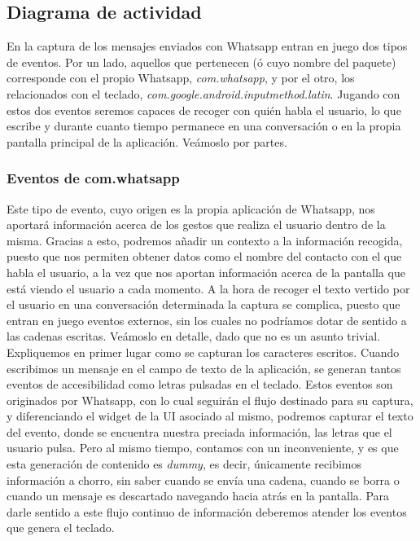\documentclass[12pt,a4paper,oneside]{book} %
\begin{document}
\subsection{Diagrama de actividad}
En la captura de los mensajes enviados con Whatsapp entran en juego dos tipos de eventos. Por un lado, aquellos que pertenecen (ó cuyo nombre del paquete) corresponde con el propio Whatsapp, \textit{com.whatsapp}, y por el otro, los relacionados con el teclado, \textit{com.google.android.inputmethod.latin}.
\newline \newline 
Jugando con estos dos eventos seremos capaces de recoger con quién habla el usuario, lo que escribe y durante cuanto tiempo permanece en una conversación o en la propia pantalla principal de la aplicación. Veámoslo por partes. 
\subsubsection{Eventos de com.whatsapp} 
Este tipo de evento, cuyo origen es la propia aplicación de Whatsapp, nos aportará información acerca de los gestos que realiza el usuario dentro de la misma. Gracias a esto, podremos añadir un contexto a la información recogida, puesto que nos permiten obtener datos como el nombre del contacto con el que habla el usuario, a la vez que nos aportan información acerca de la pantalla que está viendo el usuario a cada momento.
\newline \newline
A la hora de recoger el texto vertido por el usuario en una conversación determinada la captura se complica, puesto que entran en juego eventos externos, sin los cuales no podríamos dotar de sentido a las cadenas escritas. Veámoslo en detalle, dado que no es un asunto trivial. Expliquemos en primer lugar como se capturan los caracteres escritos. 
\newline \newline 
Cuando escribimos un mensaje en el campo de texto de la aplicación, se generan tantos eventos de accesibilidad como letras pulsadas en el teclado. Estos eventos son originados por Whatsapp, con lo cual seguirán el flujo destinado para su captura, y diferenciando el widget de la UI asociado al mismo, podremos capturar el texto del evento, donde se encuentra nuestra preciada información, las letras que el usuario pulsa. 
\newline \newline
Pero al mismo tiempo, contamos con un inconveniente, y es que esta generación de contenido es \textit{dummy}, es decir, únicamente recibimos información a chorro, sin saber cuando se envía una cadena, cuando se borra o cuando un mensaje es descartado navegando hacia atrás en la pantalla. 
\newline \newline 
Para darle sentido a este flujo continuo de información deberemos atender los eventos que genera el teclado. 
\end{document}
